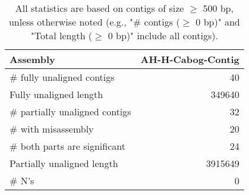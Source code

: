 \documentclass[12pt,a4paper]{article}
\begin{document}
\begin{table}[ht]
\begin{center}
\caption{All statistics are based on contigs of size $\geq$ 500 bp, unless otherwise noted (e.g., "\# contigs ($\geq$ 0 bp)" and "Total length ($\geq$ 0 bp)" include all contigs).}
\begin{tabular}{|l*{1}{|r}|}
\hline
Assembly & AH-H-Cabog-Contig \\ \hline
\# fully unaligned contigs & 40 \\ \hline
Fully unaligned length & 349640 \\ \hline
\# partially unaligned contigs & 32 \\ \hline
\hspace{5mm}\# with misassembly & 20 \\ \hline
\hspace{5mm}\# both parts are significant & 24 \\ \hline
Partially unaligned length & 3915649 \\ \hline
\# N's & 0 \\ \hline
\end{tabular}
\end{center}
\end{table}
\end{document}
